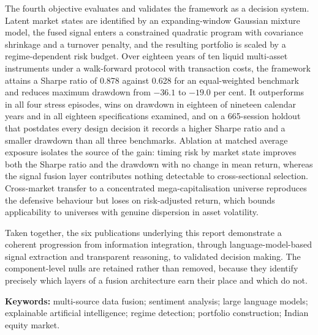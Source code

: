 The fourth objective evaluates and validates the framework as a decision system. Latent
market states are identified by an expanding-window Gaussian mixture model, the fused
signal enters a constrained quadratic program with covariance shrinkage and a turnover
penalty, and the resulting portfolio is scaled by a regime-dependent risk budget. Over
eighteen years of ten liquid multi-asset instruments under a walk-forward protocol with
transaction costs, the framework attains a Sharpe ratio of 0.878 against 0.628 for an
equal-weighted benchmark and reduces maximum drawdown from $-36.1$ to $-19.0$ per cent. It
outperforms in all four stress episodes, wins on drawdown in eighteen of nineteen calendar
years and in all eighteen specifications examined, and on a 665-session holdout that
postdates every design decision it records a higher Sharpe ratio and a smaller drawdown
than all three benchmarks. Ablation at matched average exposure isolates the source of the
gain: timing risk by market state improves both the Sharpe ratio and the drawdown with no
change in mean return, whereas the signal fusion layer contributes nothing detectable to
cross-sectional selection. Cross-market transfer to a concentrated mega-capitalisation
universe reproduces the defensive behaviour but loses on risk-adjusted return, which bounds
applicability to universes with genuine dispersion in asset volatility.

Taken together, the six publications underlying this report demonstrate a coherent
progression from information integration, through language-model-based signal extraction
and transparent reasoning, to validated decision making. The component-level nulls are
retained rather than removed, because they identify precisely which layers of a fusion
architecture earn their place and which do not.

\vspace{0.4em}
\noindent\textbf{Keywords:} multi-source data fusion; sentiment analysis; large language
models; explainable artificial intelligence; regime detection; portfolio construction;
Indian equity market.

\clearpage
\renewcommand{\contentsname}{Table of Contents}
\tableofcontents

\clearpage
\renewcommand{\listfigurename}{List of Figures}
\listoffigures

\clearpage
\renewcommand{\listtablename}{List of Tables}
\listoftables

\clearpage
